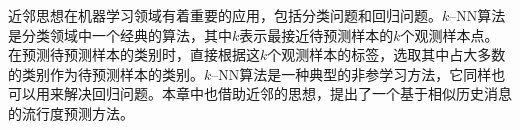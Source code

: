 近邻思想在机器学习领域有着重要的应用，包括分类问题和回归问题。$k$--NN算法是分类领域中一个经典的算法，其中$k$表示最接近待预测样本的$k$个观测样本点。在预测待预测样本的类别时，直接根据这$k$个观测样本的标签，选取其中占大多数的类别作为待预测样本的类别。$k$--NN算法是一种典型的非参学习方法\citep{le2011non}，它同样也可以用来解决回归问题\citep{bhattacharya1990kernel}。本章中也借助近邻的思想，提出了一个基于相似历史消息的流行度预测方法。
%
%
